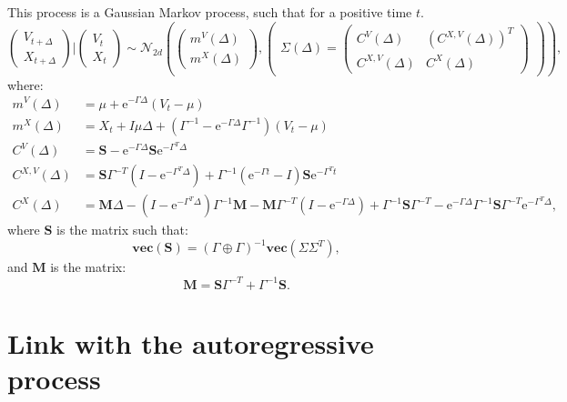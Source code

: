 \documentclass[]{book}
\newcommand{\e}{\text{e}}
\newcommand{\inv}{^{-1}}
\newcommand{\GpG}{\left( \Gamma \oplus \Gamma \right)}
\newcommand{\Vect}[1]{\textbf{vec}\left(#1 \right)}
\newcommand{\Sinf}{\mathbf{S}}
\newcommand{\M}{\mathbf{M}}
\begin{document}
This process is a Gaussian Markov process, such that for a positive time \(t\).
\[\begin{pmatrix}
V_{t + \Delta}\\
X_{t + \Delta}
\end{pmatrix} \vert \begin{pmatrix}
V_{t} \\
X_{t}
\end{pmatrix} \sim \mathcal{N}_{2d}\left( \begin{pmatrix}
m^V(\Delta)\\
m^X(\Delta)
\end{pmatrix}, \begin{pmatrix}
\Sigma(\Delta) = \begin{pmatrix}
C^{V}(\Delta) & \left(C^{X, V}(\Delta)\right)^T\\
C^{X, V}(\Delta) & C^{X}(\Delta)
\end{pmatrix}
\end{pmatrix} \right), \]
where:
\begin{align*}
m^V(\Delta) &= \mu + \e^{-\Gamma \Delta} (V_t - \mu)\\
m^X(\Delta) &= X_t + I\mu \Delta + (\Gamma\inv -  \e^{-\Gamma \Delta}\Gamma\inv)(V_t - \mu)\\
 C^V(\Delta) &= \Sinf -\e^{-\Gamma \Delta}\Sinf \e^{-\Gamma^T \Delta}\\
 C^{X,V}(\Delta) &= \Sinf \Gamma^{-T}\left(I - \e^{-\Gamma^T \Delta}\right) + \Gamma\inv\left(\e^{-\Gamma t} - I\right)\Sinf  \e^{-\Gamma^T t}\\
 C^X(\Delta) &= \M \Delta - \left(I - \e^{-\Gamma^T \Delta}\right)\Gamma\inv \M - \M\Gamma^{-T}\left(I - \e^{-\Gamma \Delta}\right)+ \Gamma\inv \Sinf \Gamma^{-T} - 
   \e^{-\Gamma \Delta}\Gamma\inv\Sinf\Gamma^{-T}\e^{-\Gamma^T \Delta},
\end{align*}
where \(\Sinf\) is the matrix such that:
\begin{equation*}
\Vect{\Sinf} = \GpG\inv\Vect{\Sigma \Sigma^T}, 
\end{equation*}
and \(\M\) is the matrix:
\begin{equation*}
\M= \Sinf\Gamma^{-T} + \Gamma\inv\Sinf.
\end{equation*}

\hypertarget{link-with-the-autoregressive-process}{%
\section{Link with the autoregressive process}\label{link-with-the-autoregressive-process}}
\end{document}
